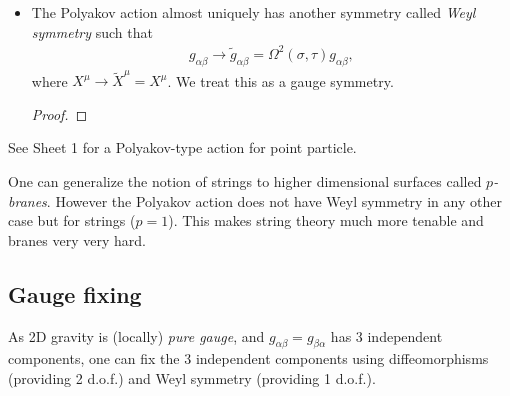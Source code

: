 \begin{itemize}
        Under infinitesimal transformation $\sigma^{\alpha} \to \widetilde{\sigma}^{\alpha} = \sigma^{\alpha} - \xi^{\alpha}$, one sees
        \begin{align}
            \delta g_{\alpha \beta} = \nabla_\alpha \xi_\beta + \nabla_\beta \xi_\alpha && \delta X^{\mu}  = \xi^{\alpha} \partial_\alpha X^{\mu}
        ,\end{align}
        where $\nabla$ is a (torsion-free) worldsheet covariant derivative
        \begin{align}
            \nabla_\alpha \xi_\beta = \partial_\alpha \xi_\beta + \tensor{\Gamma}{_{\alpha}^{\sigma}_{\beta}} \xi_\sigma
        ,\end{align}
    where $\tensor{\Gamma}{_\alpha^{\sigma}_{\beta}}$ is the Christoffel symbol for $g_{\alpha \beta}$.
    \item The Polyakov action almost uniquely has another symmetry called \emph{Weyl symmetry} such that
        \begin{align}
            g_{\alpha \beta} \to \widetilde{g}_{\alpha \beta} = \Omega^2 \left( \sigma, \tau \right) g_{\alpha \beta}
        ,\end{align}
        where $X^{\mu} \to \widetilde{X}^{\mu} = X^{\mu}$. We treat this as a gauge symmetry.
        \begin{proof}
            
        \end{proof}
\end{itemize}

\begin{note}
    See Sheet 1 for a Polyakov-type action for point particle.
\end{note}

One can generalize the notion of strings to higher dimensional surfaces called \emph{$p$-branes}. However the Polyakov action does not have Weyl symmetry in any other case but for strings ($p = 1$). This makes string theory much more tenable and branes very very hard.

\subsection{Gauge fixing}

As 2D gravity is (locally) \emph{pure gauge}, and $g_{\alpha \beta} = g_{\beta \alpha}$ has 3 independent components, one can fix the 3 independent components using diffeomorphisms (providing 2 d.o.f.) and Weyl symmetry (providing 1 d.o.f.).


